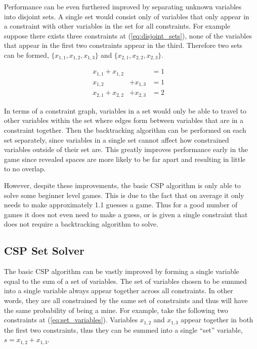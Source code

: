 \documentclass[letterpaper]{article}
\begin{document}
Performance can be even furthered improved by separating unknown variables into disjoint sets.  A single set would consist only of variables that only appear in a constraint with other variables in the set for all constraints.  For example suppose there exists three constraints at (\ref{eq:disjoint_sets}), none of the variables that appear in the first two constraints appear in the third.  Therefore two sets can be formed, $\{x_{1,1}, x_{1,2}, x_{1,3}\}$ and $\{x_{2,1}, x_{2,2}, x_{2,3}\}$.

\begin{equation}\label{eq:disjoint_sets}
\begin{aligned}
x_{1,1} + x_{1,2}& &= 1\\
x_{1,2} &+ x_{1,3} &= 1\\
x_{2,1} + x_{2,2} &+ x_{2,3} &= 2
\end{aligned}
\end{equation}

In terms of a constraint graph, variables in a set would only be able to travel to other variables within the set where edges form between variables that are in a constraint together.  Then the backtracking algorithm can be performed on each set separately, since variables in a single set cannot affect how constrained variables outside of their set are.  This greatly improves performance early in the game since revealed spaces are more likely to be far apart and resulting in little to no overlap.

However, despite these improvements, the basic CSP algorithm is only able to solve some beginner level games.  This is due to the fact that on average it only needs to make approximately 1.1 guesses a game.  Thus for a good number of games it does not even need to make a guess, or is given a single constraint that does not require a backtracking algorithm to solve.

\subsection{CSP Set Solver}
The basic CSP algorithm can be vastly improved by forming a single variable equal to the sum of a set of variables.  The set of variables chosen to be summed into a single variable always appear together across all constraints.  In other words, they are all constrained by the same set of constraints and thus will have the same probability of being a mine.  For example, take the following two constraints at (\ref{eq:set_variables}).  Variables $x_{1,2}$ and $x_{1,3}$ appear together in both the first two constraints, thus they can be summed into a single ``set'' variable, $s = x_{1,2} + x_{1,3}$.
\end{document}
